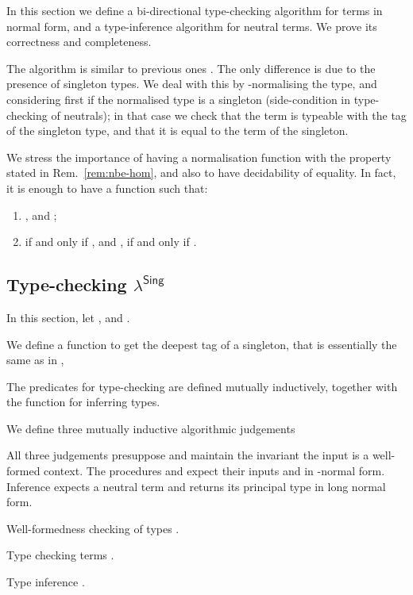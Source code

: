 \documentclass{LMCS}
\newcommand{\lambdaSing}{\texorpdfstring{\ensuremath{\lambda^{\mathsf{Sing}}}}{Singletons}}
\newcommand{\LONGVERSION}[1]{}
\newcommand{\SHORTVERSION}[1]{#1}
\newcommand{\LONGSHORT}[2]{\LONGVERSION{#1}\SHORTVERSION{#2}}
\newcommand{\localpara}[1]{\noindent #1.}
\begin{document}
{  In this section we define a bi-directional type-checking algorithm
  for terms in normal form, and a type-inference algorithm for neutral
  terms. We prove its correctness and completeness.

  The algorithm is similar to previous ones
  \cite{coquand:type,abelCoquandDybjer:flops08}.  The only difference is
  due to the presence of singleton types. We deal with this by
  -normalising the type, and considering first if the normalised
  type is a singleton (side-condition in type-checking of neutrals);
  in that case we check that the term is typeable with the tag of the
  singleton type, and that it is equal to the term of the singleton.

  We stress the importance of having a normalisation function with the
  property stated in Rem.~\ref{rem:nbe-hom}, and also to have
  decidability of equality. In fact, it is enough to have a function
   such that:
  
    \begin{enumerate}
    \item , and
      ; 
    \item  if and only if 
      , and 
      , if and only if
      .
    \end{enumerate}  
}







\subsection{Type-checking \lambdaSing}

In this section, let , and .
\LONGSHORT{
For obtaining the deepest tag of a singleton type, 
we define an operation on types, which
is essentially the same as the one defined by Aspinall~\cite{aspinall:csl94}.
  \begin{defi}[Singleton's tag] 
    
  \end{defi}
}{ 
  We define a function to get the deepest tag of a singleton, that is
  essentially the same as in \cite{aspinall:csl94},
    
}\medskip

  \noindent The predicates for type-checking are defined mutually inductively,
  together with the function for inferring types.

  \begin{defi}
    \label{alg:typecheking}
We define three mutually inductive algorithmic judgements

All three judgements presuppose and maintain the invariant the
input  is a well-formed context. The procedures  and  expect
their inputs  and  in -normal form.  Inference  expects a neutral term  and returns its principal type
 in long normal form. 
\vspace{0.7em}

\localpara{Well-formedness checking of types }
    
\localpara{Type checking terms } 

\localpara{Type inference } 

    \end{defi}\medskip
  
\end{document}
